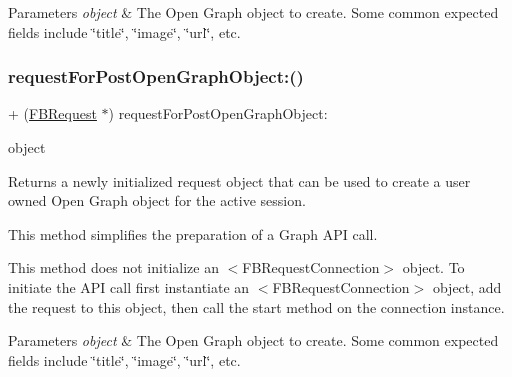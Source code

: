 \begin{DoxyParams}{Parameters}
{\em object} & The Open Graph object to create. Some common expected fields include \char`\"{}title\char`\"{}, \char`\"{}image\char`\"{}, \char`\"{}url\char`\"{}, etc. \\
\hline
\end{DoxyParams}
\mbox{\label{interfaceFBRequest_a7eed076cb1c83e3dfe4f29ccfebe68b4}} 
\subsubsection{\texorpdfstring{request\+For\+Post\+Open\+Graph\+Object\+:()}{requestForPostOpenGraphObject:()}\hspace{0.1cm}{\footnotesize\ttfamily [4/5]}}
{\footnotesize\ttfamily + (\hyperlink{interfaceFBRequest}{F\+B\+Request} $\ast$) request\+For\+Post\+Open\+Graph\+Object\+: \begin{DoxyParamCaption}\item[{(id$<$ \hyperlink{protocolFBOpenGraphObject-p}{F\+B\+Open\+Graph\+Object} $>$)}]{object }\end{DoxyParamCaption}}

Returns a newly initialized request object that can be used to create a user owned Open Graph object for the active session.

This method simplifies the preparation of a Graph A\+PI call.

This method does not initialize an $<$\+F\+B\+Request\+Connection$>$ object. To initiate the A\+PI call first instantiate an $<$\+F\+B\+Request\+Connection$>$ object, add the request to this object, then call the {\ttfamily start} method on the connection instance.


\begin{DoxyParams}{Parameters}
{\em object} & The Open Graph object to create. Some common expected fields include \char`\"{}title\char`\"{}, \char`\"{}image\char`\"{}, \char`\"{}url\char`\"{}, etc. \\
\hline
\end{DoxyParams}
\mbox{\label{interfaceFBRequest_a7eed076cb1c83e3dfe4f29ccfebe68b4}} 
